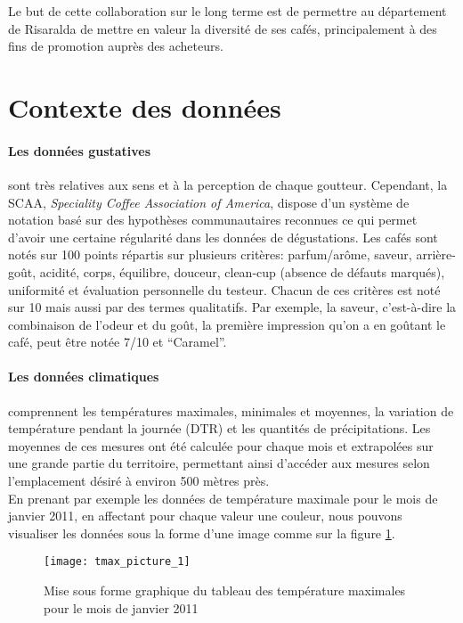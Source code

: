 Le but de cette collaboration sur le long terme est de permettre au département de Risaralda de mettre en valeur la diversité de ses cafés, principalement à des fins de promotion auprès des acheteurs. \\


\section{Contexte des données}
\paragraph{Les données gustatives}sont très relatives aux sens et à la perception de chaque goutteur. Cependant, la SCAA, \textit{Speciality Coffee Association of America}, dispose d’un système de notation basé sur des hypothèses communautaires reconnues ce qui permet d’avoir une certaine régularité dans les données de dégustations. Les cafés sont notés sur 100 points répartis sur plusieurs critères: parfum/arôme, saveur, arrière-goût, acidité, corps, équilibre, douceur, clean-cup (absence de défauts marqués), uniformité et évaluation personnelle du testeur.  Chacun de ces critères est noté sur 10 mais aussi par des termes qualitatifs. Par exemple, la saveur, c’est-à-dire la combinaison de l’odeur et du goût, la première impression qu’on a en goûtant le café, peut être notée 7/10 et “Caramel”. 

\paragraph{Les données climatiques}comprennent les températures maximales, minimales et moyennes, la variation de température pendant la journée (DTR) et les quantités de précipitations. Les moyennes de ces mesures ont été calculée pour chaque mois et extrapolées sur une grande partie du territoire, permettant ainsi d’accéder aux mesures selon l’emplacement désiré à environ 500 mètres près. \\

En prenant par exemple les données de température maximale pour le mois de janvier 2011, en affectant pour chaque valeur une couleur, nous pouvons visualiser les données sous la forme d'une image comme sur la figure \ref{tmax_picture}.


\begin{figure}[h]
	\texttt{[image: tmax\_picture\_1]}
	\caption{\label{tmax_picture} Mise sous forme graphique du tableau des température maximales pour le mois de janvier 2011 }
\end{figure}

